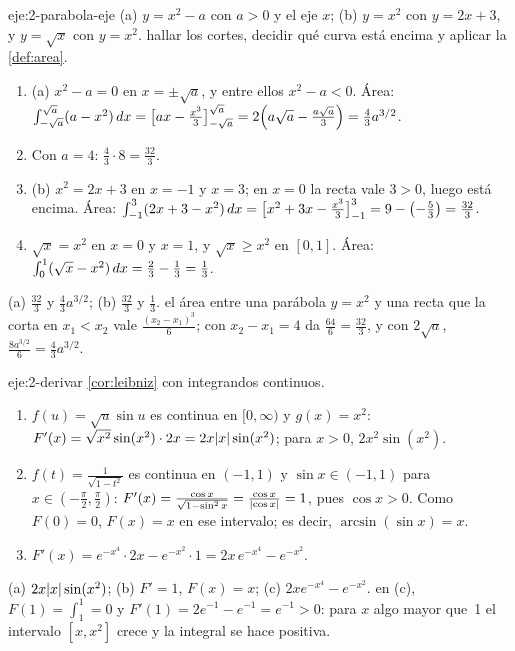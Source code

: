 \begin{solucion}{eje:2-parabola-eje}
\datos (a) $y=x^{2}-a$ con $a>0$ y el eje $x$; (b) $y=x^{2}$ con $y=2x+3$, y $y=\sqrt x$ con $y=x^{2}$.
\planteamiento hallar los cortes, decidir qué curva está encima y aplicar la \cref{def:area}.
\pasos
\begin{enumerate}[label=\arabic*.]
  \item (a) $x^{2}-a=0$ en $x=\pm\sqrt a$, y entre ellos $x^{2}-a<0$. Área: $\int_{-\sqrt a}^{\sqrt a}(a-x^{2})\mathop{}\!d x=\bigl[ax-\frac{x^{3}}{3}\bigr]_{-\sqrt a}^{\sqrt a}=2\Bigl(a\sqrt a-\frac{a\sqrt a}{3}\Bigr)=\frac43a^{3/2}$.
  \item Con $a=4$: $\frac43\cdot8=\frac{32}{3}$.
  \item (b) $x^{2}=2x+3$ en $x=-1$ y $x=3$; en $x=0$ la recta vale $3>0$, luego está encima. Área: $\int_{-1}^{3}(2x+3-x^{2})\mathop{}\!d x=\bigl[x^{2}+3x-\frac{x^{3}}{3}\bigr]_{-1}^{3}=9-\bigl(-\frac53\bigr)=\frac{32}{3}$.
  \item $\sqrt x=x^{2}$ en $x=0$ y $x=1$, y $\sqrt x\ge x^{2}$ en $[0,1]$. Área: $\int_0^{1}(\sqrt x-x^{2})\mathop{}\!d x=\frac23-\frac13=\frac13$.
\end{enumerate}
\resultado (a) $\frac{32}{3}$ y $\frac43a^{3/2}$; (b) $\frac{32}{3}$ y $\frac13$.
\comprobacion el área entre una parábola $y=x^{2}$ y una recta que la corta en $x_1<x_2$ vale $\frac{(x_2-x_1)^{3}}{6}$; con $x_2-x_1=4$ da $\frac{64}{6}=\frac{32}{3}$, y con $2\sqrt a$, $\frac{8a^{3/2}}{6}=\frac43a^{3/2}$.
\end{solucion}

\begin{solucion}{eje:2-derivar}
\planteamiento \cref{cor:leibniz} con integrandos continuos.
\pasos
\begin{enumerate}[label=(\alph*)]
  \item $f(u)=\sqrt u\sin u$ es continua en $[0,\infty)$ y $g(x)=x^{2}$: $F'(x)=\sqrt{x^{2}}\sin(x^{2})\cdot2x=2x\lvert x\rvert\sin(x^{2})$; para $x>0$, $2x^{2}\sin(x^{2})$.
  \item $f(t)=\frac{1}{\sqrt{1-t^{2}}}$ es continua en $(-1,1)$ y $\sin x\in(-1,1)$ para $x\in(-\frac\pi2,\frac\pi2)$: $F'(x)=\frac{\cos x}{\sqrt{1-\sin^{2}x}}=\frac{\cos x}{\lvert\cos x\rvert}=1$, pues $\cos x>0$. Como $F(0)=0$, $F(x)=x$ en ese intervalo; es decir, $\arcsin(\sin x)=x$.
  \item $F'(x)=e^{-x^{4}}\cdot2x-e^{-x^{2}}\cdot1=2x\,e^{-x^{4}}-e^{-x^{2}}$.
\end{enumerate}
\resultado (a) $2x\lvert x\rvert\sin(x^{2})$; (b) $F'=1$, $F(x)=x$; (c) $2xe^{-x^{4}}-e^{-x^{2}}$.
\comprobacion en (c), $F(1)=\int_1^{1}=0$ y $F'(1)=2e^{-1}-e^{-1}=e^{-1}>0$: para $x$ algo mayor que~1 el intervalo $[x,x^{2}]$ crece y la integral se hace positiva.
\end{solucion}

